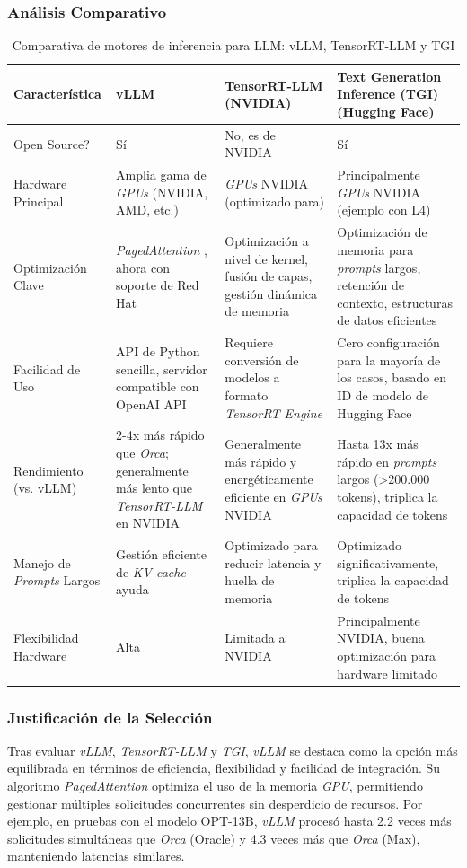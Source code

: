\subsubsection*{Análisis Comparativo}
\begin{table}[H]
\centering
\begin{tabular}{|p{3.5cm}|p{3cm}|p{3cm}|p{3cm}|}
\hline
\textbf{Característica} & \textbf{vLLM} & \textbf{TensorRT-LLM (NVIDIA)} & \textbf{Text Generation Inference (TGI) (Hugging Face)} \\
\hline
Open Source? & Sí & No, es de NVIDIA & Sí \\
\hline
Hardware Principal & Amplia gama de \textit{GPUs} (NVIDIA, AMD, etc.) & \textit{GPUs} NVIDIA (optimizado para) & Principalmente \textit{GPUs} NVIDIA (ejemplo con L4) \\
\hline
Optimización Clave & \textit{PagedAttention} \cite{ref39}, ahora con soporte de Red Hat & Optimización a nivel de kernel, fusión de capas, gestión dinámica de memoria & Optimización de memoria para \textit{prompts} largos, retención de contexto, estructuras de datos eficientes \\
\hline
Facilidad de Uso & API de Python sencilla, servidor compatible con OpenAI API & Requiere conversión de modelos a formato \textit{TensorRT Engine} & Cero configuración para la mayoría de los casos, basado en ID de modelo de Hugging Face \\
\hline
Rendimiento (vs. vLLM) & 2-4x más rápido que \textit{Orca}; generalmente más lento que \textit{TensorRT-LLM} en NVIDIA & Generalmente más rápido y energéticamente eficiente en \textit{GPUs} NVIDIA & Hasta 13x más rápido en \textit{prompts} largos (>200.000 tokens), triplica la capacidad de tokens \\
\hline
Manejo de \textit{Prompts} Largos & Gestión eficiente de \textit{KV cache} ayuda & Optimizado para reducir latencia y huella de memoria & Optimizado significativamente, triplica la capacidad de tokens \\
\hline
Flexibilidad Hardware & Alta & Limitada a NVIDIA & Principalmente NVIDIA, buena optimización para hardware limitado \\
\hline
\end{tabular}
\captionsetup{justification=centering}
\caption{Comparativa de motores de inferencia para LLM: vLLM, TensorRT-LLM y TGI}
\label{tab:comparativa_motores_inferencia}
\end{table}

\subsubsection*{Justificación de la Selección}
Tras evaluar \textit{vLLM}, \textit{TensorRT-LLM} y \textit{TGI}, \textit{vLLM} se destaca como la opción más equilibrada en términos de eficiencia, flexibilidad y facilidad de integración. Su algoritmo \textit{PagedAttention} optimiza el uso de la memoria \textit{GPU}, permitiendo gestionar múltiples solicitudes concurrentes sin desperdicio de recursos. Por ejemplo, en pruebas con el modelo OPT-13B, \textit{vLLM} procesó hasta 2.2 veces más solicitudes simultáneas que \textit{Orca} (Oracle) y 4.3 veces más que \textit{Orca} (Max), manteniendo latencias similares.

